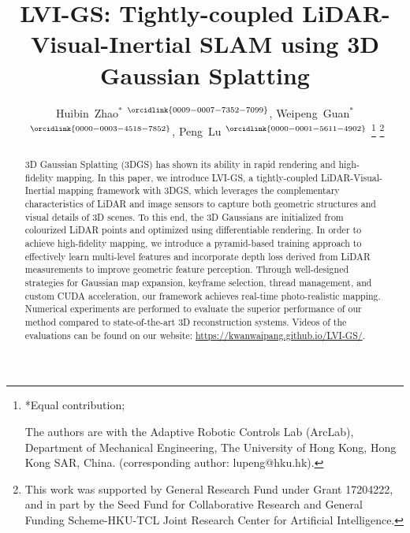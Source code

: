 \documentclass[lettersize,journal]{IEEEtran}
\begin{document}
\title{LVI-GS: Tightly-coupled LiDAR-Visual-Inertial SLAM using 3D Gaussian Splatting}

\author{Huibin~Zhao$^{*}$\hspace{-1.5mm}$^{~\orcidlink{0009-0007-7352-7099}}$, Weipeng~Guan$^{*}$\hspace{-1.5mm}$^{~\orcidlink{0000-0003-4518-7852}}$,   Peng~Lu\hspace{-1.5mm}$^{~\orcidlink{0000-0001-5611-4902}}$  %
    \thanks{
        *Equal contribution; 
    
        The authors are with the Adaptive Robotic Controls Lab (ArcLab), Department of Mechanical Engineering, The University of Hong Kong, Hong Kong SAR, China.
        (corresponding author: lupeng@hku.hk). 
        }%
    \thanks{
        This work was supported by General Research Fund under Grant 17204222, and in part by the Seed Fund for Collaborative Research and General Funding Scheme-HKU-TCL Joint Research Center for Artificial Intelligence.
        }%
}



\maketitle

\begin{abstract}

3D Gaussian Splatting (3DGS) has shown its ability in rapid rendering and high-fidelity mapping.
In this paper, we introduce LVI-GS, a tightly-coupled LiDAR-Visual-Inertial mapping framework with 3DGS, which leverages the complementary characteristics of LiDAR and image sensors to capture both geometric structures and visual details of 3D scenes.
To this end, the 3D Gaussians are initialized from colourized LiDAR points and optimized using differentiable rendering.
In order to achieve high-fidelity mapping, we introduce a pyramid-based training approach to effectively learn multi-level features and incorporate depth loss derived from LiDAR measurements to improve geometric feature perception.
Through well-designed strategies for Gaussian map expansion, keyframe selection, thread management, and custom CUDA acceleration, our framework achieves real-time photo-realistic mapping.
Numerical experiments are performed to evaluate the superior performance of our method compared to state-of-the-art 3D reconstruction systems.
Videos of the evaluations can be found on our website: \url{https://kwanwaipang.github.io/LVI-GS/}.
\end{abstract}
\end{document}
